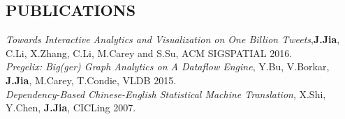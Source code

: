 \documentclass{res}
\begin{document}
\begin{resume}
\section{PUBLICATIONS}
\emph{Towards Interactive Analytics and Visualization on One Billion Tweets},\textbf{J.Jia}, C.Li, X.Zhang, C.Li, M.Carey and S.Su, ACM SIGSPATIAL 2016.\\
\emph{Pregelix: Big(ger) Graph Analytics on A Dataflow Engine}, Y.Bu, V.Borkar, \textbf{J.Jia}, M.Carey, T.Condie, VLDB 2015.\\
\emph{Dependency-Based Chinese-English Statistical Machine Translation}, X.Shi, Y.Chen, \textbf{J.Jia}, CICLing 2007.\\

\end{resume}
\end{document}

